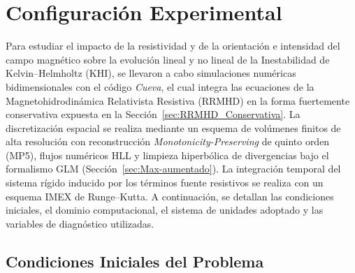 
\section{Configuración Experimental}
\label{sec:setup_experimental}

Para estudiar el impacto de la resistividad y de la orientación e intensidad del campo magnético sobre la evolución lineal y no lineal de la Inestabilidad de Kelvin--Helmholtz (KHI), se llevaron a cabo simulaciones numéricas bidimensionales con el código \textit{Cueva}, el cual integra las ecuaciones de la Magnetohidrodinámica Relativista Resistiva (RRMHD) en la forma fuertemente conservativa expuesta en la Sección~\ref{sec:RRMHD_Conservativa}. La discretización espacial se realiza mediante un esquema de volúmenes finitos de alta resolución con reconstrucción \textit{Monotonicity-Preserving} de quinto orden (MP5), flujos numéricos HLL y limpieza hiperbólica de divergencias bajo el formalismo GLM (Sección~\ref{sec:Max-aumentado}). La integración temporal del sistema rígido inducido por los términos fuente resistivos se realiza con un esquema IMEX de Runge--Kutta. A continuación, se detallan las condiciones iniciales, el dominio computacional, el sistema de unidades adoptado y las variables de diagnóstico utilizadas.

\subsection{Condiciones Iniciales del Problema}
\label{subsec:condiciones_iniciales}

